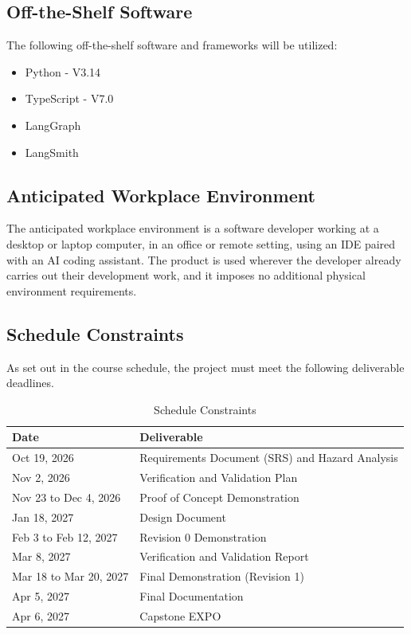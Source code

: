 \documentclass[12pt]{article}
\begin{document}
\subsection{Off-the-Shelf Software}

The following off-the-shelf software and frameworks will be utilized:
\begin{itemize}
  \item Python - V3.14
  \item TypeScript - V7.0
  \item LangGraph
  \item LangSmith
\end{itemize}

\subsection{Anticipated Workplace Environment}

The anticipated workplace environment is a software developer working at a
desktop or laptop computer, in an office or remote setting, using an IDE paired
with an AI coding assistant. The product is used wherever the developer already
carries out their development work, and it imposes no additional physical
environment requirements.

\subsection{Schedule Constraints}

As set out in the course schedule, the project must meet the following
deliverable deadlines.

\begin{table}[h!]
\centering
\caption{Schedule Constraints}
\label{TblSchedule}
\begin{tabular}{l p{8.5cm}}
\toprule
\textbf{Date} & \textbf{Deliverable} \\
\midrule
Oct 19, 2026       & Requirements Document (SRS) and Hazard Analysis \\
Nov 2, 2026        & Verification and Validation Plan \\
Nov 23 to Dec 4, 2026 & Proof of Concept Demonstration \\
Jan 18, 2027        & Design Document \\
Feb 3 to Feb 12, 2027 & Revision 0 Demonstration \\
Mar 8, 2027        & Verification and Validation Report \\
Mar 18 to Mar 20, 2027 & Final Demonstration (Revision 1) \\
Apr 5, 2027       & Final Documentation \\
Apr 6, 2027         & Capstone EXPO \\
\bottomrule
\end{tabular}
\end{table}
\end{document}
